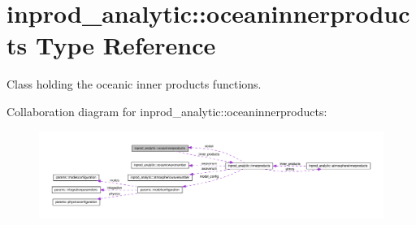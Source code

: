 \hypertarget{structinprod__analytic_1_1oceaninnerproducts}{}\section{inprod\+\_\+analytic\+:\+:oceaninnerproducts Type Reference}
\label{structinprod__analytic_1_1oceaninnerproducts}


Class holding the oceanic inner products functions.  




Collaboration diagram for inprod\+\_\+analytic\+:\+:oceaninnerproducts\+:\nopagebreak
\begin{figure}[H]
\begin{center}
\leavevmode
\includegraphics[width=350pt]{structinprod__analytic_1_1oceaninnerproducts__coll__graph}
\end{center}
\end{figure}
